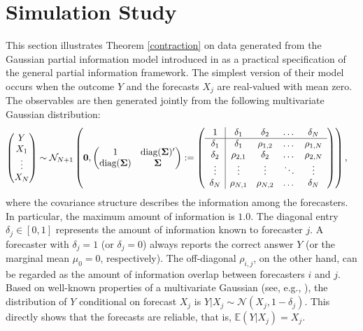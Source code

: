 \documentclass[11pt]{article}
\newcommand{\E}{\mathbb{E}}
\theoremstyle{definition}
\theoremstyle{definition}
\def\bSigma{{\bf \Sigma}}
\def\E{{\mathbb E}}
\def\diag{\text{diag}}
\def\diag{\text{diag}}
\begin{document}
\section{Simulation Study} \label{simulation}

This section illustrates Theorem \ref{contraction} on data generated from the Gaussian partial information model introduced in \cite{satopaamodeling2, satopaamodeling} as a practical specification of the general partial information framework. 
 The simplest version of their model occurs when the outcome $Y$ and the forecasts $X_j$ are real-valued with mean zero. The observables are then generated jointly from the following multivariate Gaussian distribution:
\begin{align}
\left(\begin{matrix} Y \\ X_{1}\\ \vdots \\ X_{N} \end{matrix}\right) &\sim \mathcal{N}_{N+1}\left( 
 \boldsymbol{0}, \left(\begin{matrix} 
1 & \diag(\bSigma)'\\
\diag(\bSigma) &\bSigma\\
 \end{matrix}\right) 
 :=
 \left(\begin{array}{c | c c cc }
1 & \delta_1 & \delta_2 & \dots & \delta_N  \\ \hline
\delta_1 & \delta_1 &\rho_{1,2} & \dots & \rho_{1,N}   \\ 
\delta_2 & \rho_{2,1} & \delta_2 & \dots & \rho_{2,N}  \\ 
\vdots & \vdots & \vdots & \ddots & \vdots  \\ 
\delta_N & \rho_{N,1} & \rho_{N,2} & \dots & \delta_N\\ 
 \end{array}\right)\right),  \label{NExperts}
\end{align}
where the covariance structure describes the information among the forecasters. In particular, the maximum amount of information is $1.0$. The diagonal entry $\delta_j \in [0,1]$ represents the amount of information known to forecaster $j$. A forecaster with $\delta_j = 1$ (or $\delta_j = 0$) always reports the correct answer $Y$ (or the marginal mean $\mu_0 = 0$, respectively). The off-diagonal $\rho_{i,j}$, on the other hand, can be regarded as the amount of information overlap between forecasters $i$ and $j$. Based on well-known properties of a multivariate Gaussian (see, e.g., \citealt{ravishanker2001first}), the distribution of $Y$ conditional on forecast $X_j$ is $Y|X_j \sim \mathcal{N}(X_j, 1-\delta_j)$. This directly shows that the forecasts are reliable, that is, $\E(Y | X_j) = X_j$. 
\end{document}
